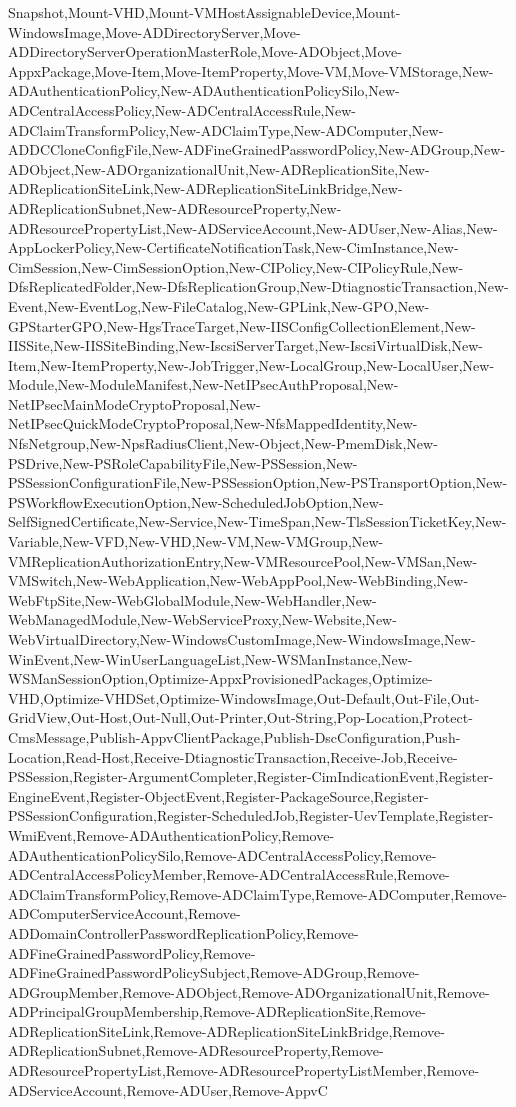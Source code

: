 {{Snapshot,Mount-VHD,Mount-VMHostAssignableDevice,Mount-WindowsImage,Move-ADDirectoryServer,Move-ADDirectoryServerOperationMasterRole,Move-ADObject,Move-AppxPackage,Move-Item,Move-ItemProperty,Move-VM,Move-VMStorage,New-ADAuthenticationPolicy,New-ADAuthenticationPolicySilo,New-ADCentralAccessPolicy,New-ADCentralAccessRule,New-ADClaimTransformPolicy,New-ADClaimType,New-ADComputer,New-ADDCCloneConfigFile,New-ADFineGrainedPasswordPolicy,New-ADGroup,New-ADObject,New-ADOrganizationalUnit,New-ADReplicationSite,New-ADReplicationSiteLink,New-ADReplicationSiteLinkBridge,New-ADReplicationSubnet,New-ADResourceProperty,New-ADResourcePropertyList,New-ADServiceAccount,New-ADUser,New-Alias,New-AppLockerPolicy,New-CertificateNotificationTask,New-CimInstance,New-CimSession,New-CimSessionOption,New-CIPolicy,New-CIPolicyRule,New-DfsReplicatedFolder,New-DfsReplicationGroup,New-DtiagnosticTransaction,New-Event,New-EventLog,New-FileCatalog,New-GPLink,New-GPO,New-GPStarterGPO,New-HgsTraceTarget,New-IISConfigCollectionElement,New-IISSite,New-IISSiteBinding,New-IscsiServerTarget,New-IscsiVirtualDisk,New-Item,New-ItemProperty,New-JobTrigger,New-LocalGroup,New-LocalUser,New-Module,New-ModuleManifest,New-NetIPsecAuthProposal,New-NetIPsecMainModeCryptoProposal,New-NetIPsecQuickModeCryptoProposal,New-NfsMappedIdentity,New-NfsNetgroup,New-NpsRadiusClient,New-Object,New-PmemDisk,New-PSDrive,New-PSRoleCapabilityFile,New-PSSession,New-PSSessionConfigurationFile,New-PSSessionOption,New-PSTransportOption,New-PSWorkflowExecutionOption,New-ScheduledJobOption,New-SelfSignedCertificate,New-Service,New-TimeSpan,New-TlsSessionTicketKey,New-Variable,New-VFD,New-VHD,New-VM,New-VMGroup,New-VMReplicationAuthorizationEntry,New-VMResourcePool,New-VMSan,New-VMSwitch,New-WebApplication,New-WebAppPool,New-WebBinding,New-WebFtpSite,New-WebGlobalModule,New-WebHandler,New-WebManagedModule,New-WebServiceProxy,New-Website,New-WebVirtualDirectory,New-WindowsCustomImage,New-WindowsImage,New-WinEvent,New-WinUserLanguageList,New-WSManInstance,New-WSManSessionOption,Optimize-AppxProvisionedPackages,Optimize-VHD,Optimize-VHDSet,Optimize-WindowsImage,Out-Default,Out-File,Out-GridView,Out-Host,Out-Null,Out-Printer,Out-String,Pop-Location,Protect-CmsMessage,Publish-AppvClientPackage,Publish-DscConfiguration,Push-Location,Read-Host,Receive-DtiagnosticTransaction,Receive-Job,Receive-PSSession,Register-ArgumentCompleter,Register-CimIndicationEvent,Register-EngineEvent,Register-ObjectEvent,Register-PackageSource,Register-PSSessionConfiguration,Register-ScheduledJob,Register-UevTemplate,Register-WmiEvent,Remove-ADAuthenticationPolicy,Remove-ADAuthenticationPolicySilo,Remove-ADCentralAccessPolicy,Remove-ADCentralAccessPolicyMember,Remove-ADCentralAccessRule,Remove-ADClaimTransformPolicy,Remove-ADClaimType,Remove-ADComputer,Remove-ADComputerServiceAccount,Remove-ADDomainControllerPasswordReplicationPolicy,Remove-ADFineGrainedPasswordPolicy,Remove-ADFineGrainedPasswordPolicySubject,Remove-ADGroup,Remove-ADGroupMember,Remove-ADObject,Remove-ADOrganizationalUnit,Remove-ADPrincipalGroupMembership,Remove-ADReplicationSite,Remove-ADReplicationSiteLink,Remove-ADReplicationSiteLinkBridge,Remove-ADReplicationSubnet,Remove-ADResourceProperty,Remove-ADResourcePropertyList,Remove-ADResourcePropertyListMember,Remove-ADServiceAccount,Remove-ADUser,Remove-AppvC}}
